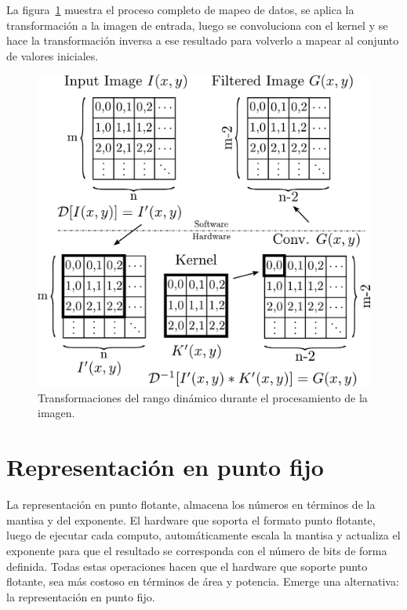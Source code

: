 La figura~\ref{transformation} muestra el proceso completo de mapeo de datos, se
aplica la transformación a la imagen de entrada, luego se convoluciona con el
kernel y se hace la transformación inversa a ese resultado para volverlo a
mapear al conjunto de valores iniciales.

\begin{figure}
\centering
\includegraphics[scale=0.5]{wflow3}
\caption{Transformaciones del rango dinámico durante el procesamiento de la imagen.}
\label{transformation}
\end{figure}

\section{Representación en punto fijo}\label{fixedpoint}

La representación en punto flotante, almacena los números en términos de la
mantisa y del exponente. El hardware que soporta el formato punto flotante,
luego de ejecutar cada computo, automáticamente escala la mantisa y actualiza el
exponente para que el resultado se corresponda con el número de bits de forma
definida. Todas estas operaciones hacen que el hardware que soporte punto
flotante, sea más costoso en términos de área y potencia. Emerge una
alternativa: la representación en punto fijo.

